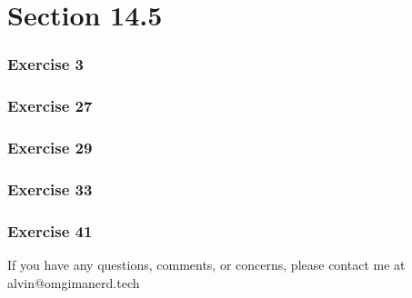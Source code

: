\documentclass[letterpaper, 12pt]{math}
\begin{document}
\section*{Section 14.5}

\subsubsection*{Exercise 3}
\subsubsection*{Exercise 27}
\subsubsection*{Exercise 29}
\subsubsection*{Exercise 33}
\subsubsection*{Exercise 41}

\begin{center}
  If you have any questions, comments, or concerns, please contact me at
  alvin@omgimanerd.tech
\end{center}
\end{document}
